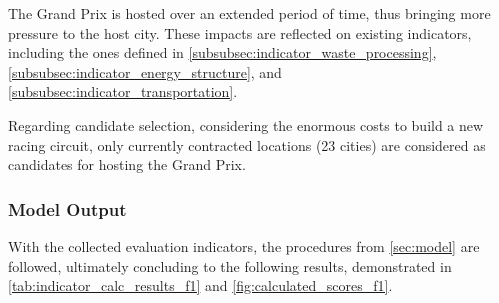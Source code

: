 \documentclass{mcmthesis}
\begin{document}
The Grand Prix is hosted over an extended period of time, thus bringing more pressure to the host city. These impacts are reflected on existing indicators, including the ones defined in \cref{subsubsec:indicator_waste_processing}, \cref{subsubsec:indicator_energy_structure}, and \cref{subsubsec:indicator_transportation}.

Regarding candidate selection, considering the enormous costs to build a new racing circuit, only currently contracted locations (23 cities) are considered as candidates for hosting the Grand Prix. 

\subsubsection{Model Output} \label{subsubsec:f1_model_output}

With the collected evaluation indicators, the procedures from \cref{sec:model} are followed, ultimately concluding to the following results, demonstrated in \cref{tab:indicator_calc_results_f1} and \cref{fig:calculated_scores_f1}. 
\end{document}
